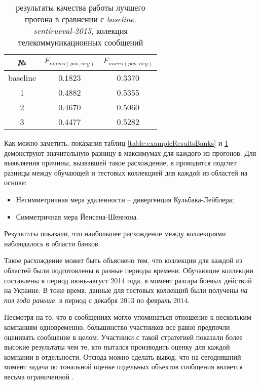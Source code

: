      \begin{table}[H]
        \centering
        \caption{результаты качества работы лучшего прогона в сравнении с {\it baseline}.
        {\it sentirueval-2015}, колекция телекоммуникационных сообщений}
        \label{table:exampleResultsTTK}
        \begin{tabular}{|c|c|c|}
        \hline
        №                       &       $F_{macro(pos, neg)}$        & $F_{micro(pos, neg)}$  \\ \hline
        baseline                &           0.1823                      &       0.3370              \\ \hline \hline
        1                       &           0.4882                      &       0.5355              \\ \hline
        2                       &           0.4670                      &       0.5060              \\ \hline
        3                       &           0.4477                      &       0.5282              \\ \hline
        \end{tabular}
     \end{table}

    Как можно заметить, показания таблиц \ref{table:exampleResultsBanks} и \ref{table:exampleResultsTTK}
    демонструют значительную разницу в максимумах для каждого из прогонов. Для выявляения причины, вызвавшей
    такое расхождение, в \cite{tonalityAnalisys} проводится подсчет разницы между обучающей
    и тестовых коллекцией для каждой из областей на основе:
    \begin{itemize}
        \item Несимметричная мера удаленности -- дивергенция Кульбака-Лейблера;
        \item Симметричная мера Йенсена-Шеннона.
    \end{itemize}

    Результaты показали, что наибольшее расхождение между коллекциями наблюдалось в
    области банков.

    Такое расхождение может быть объяснено тем, что коллекции для каждой из областей
    были подготовлены в разные периоды времени. Обучающие коллекции составлены в
    период июнь-август 2014 года, в момент разгара боевых действий на Украине.
    В тоже время, данные для тестовых коллекций были получены {\it на пол года раньше}, в период с
    декабря 2013 по февраль 2014.

    Несмотря на то, что в сообщениях могло упоминаться отношение к нескольким
    компаниям одновременно, большинство участников все равно предпочли
    оценивать сообщение в целом. Участники с такой стратегией показали
    более высокие результаты чем те, кто пытался производить оценку для каждой
    компании в отдельности. Отсюда можно сделать вывод, что на сегодняшний момент
    задача по тональной оценке отдельных объектов сообщения является весьма
    ограниченной \cite{tonalityAnalisys}.
